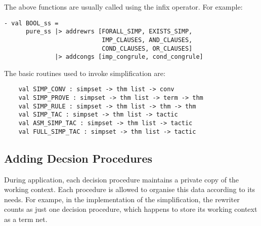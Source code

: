The above functions 
are usually called using the \ml{|>} infix operator.  For example:
\begin{session} \begin{verbatim}
- val BOOL_ss = 
      pure_ss |> addrewrs [FORALL_SIMP, EXISTS_SIMP,
                           IMP_CLAUSES, AND_CLAUSES,
                           COND_CLAUSES, OR_CLAUSES]
              |> addcongs [imp_congrule, cond_congrule]
\end{verbatim} \end{session}

The basic routines used to invoke simplification are:
\begin{boxed} \begin{verbatim}
    val SIMP_CONV : simpset -> thm list -> conv
    val SIMP_PROVE : simpset -> thm list -> term -> thm
    val SIMP_RULE : simpset -> thm list -> thm -> thm
    val SIMP_TAC : simpset -> thm list -> tactic
    val ASM_SIMP_TAC : simpset -> thm list -> tactic
    val FULL_SIMP_TAC : simpset -> thm list -> tactic
\end{verbatim} \end{boxed}






\subsection{Adding Decsion Procedures}

\label{adding-dprocs}
During application, each decision procedure maintains
a private copy of the working context.
Each procedure is allowed to organise this data according to its needs.  
For exampe, in the implementation of the simplification, the rewriter counts
as just one decision procedure, which happens to store its working
context as a term net.

